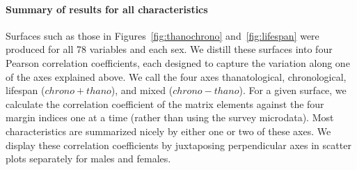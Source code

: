 \documentclass[11pt,oneside]{article} %
\begin{document}
\paragraph{Summary of results for all characteristics}
Surfaces such as those in Figures~\ref{fig:thanochrono} and~\ref{fig:lifespan}
were produced for all 78 variables and each sex. We distill these surfaces into
four Pearson correlation coefficients, each designed to capture the variation along one of the axes explained above. We call the four axes
thanatological, chronological, lifespan ($chrono+thano$), and mixed
($chrono-thano$). For a given surface, we calculate the correlation
coefficient of the matrix elements against the four margin indices one at a
time (rather than using the survey microdata).
Most characteristics are summarized nicely by either one or two of these axes.
We display these correlation coefficients by juxtaposing perpendicular axes in
scatter plots separately for males and females.
\end{document}
